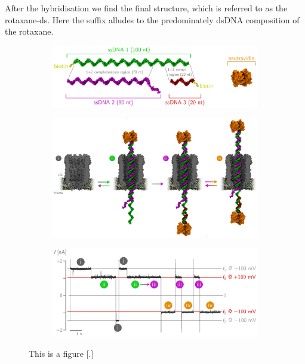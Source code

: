 After the hybridisation we find the final structure, which is referred to as the
rotaxane-ds. Here the suffix alludes to the predominately dsDNA composition of the
rotaxane.\\


\begin{figure}[ht!]
  \begin{centering}
  \begin{subfigure}[t]{\dimexpr.92\linewidth-1.3em\relax}
  \centering
  \includegraphics[width=\linewidth,valign=t]{Figures/RConstruction1.png}
  \end{subfigure}%
  \vspace{0.5cm}
  \begin{subfigure}[t]{\dimexpr.92\linewidth-1.3em\relax}
  \centering
  \includegraphics[width=\linewidth,valign=t]{Figures/RConstruction2.png}
  \end{subfigure}%
  \vspace{0.5cm}
  \begin{subfigure}[t]{\dimexpr.92\linewidth-1.3em\relax}
  \centering
  \includegraphics[width=\linewidth,valign=t]{Figures/RConstruction3.png}
  \end{subfigure}
  \caption{This is a figure [.]}
  \label{fig:test}
  \end{centering}
\end{figure}


\newpage
